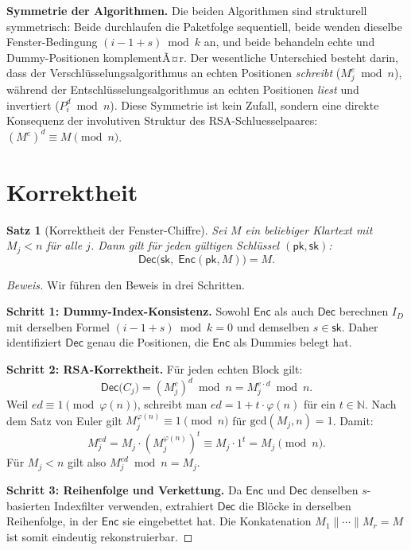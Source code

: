 ﻿\documentclass[12pt, a4paper]{article}
\theoremstyle{plain}
\newtheorem{theorem}{Satz}[section]
\theoremstyle{definition}
\theoremstyle{remark}
\newenvironment{myproof}[1][Beweis]{%
  \begin{proof}[#1]
}{%
  \end{proof}
}
\newcommand{\N}{\mathbb{N}}
\newcommand{\pk}{\mathsf{pk}}
\newcommand{\sk}{\mathsf{sk}}
\newcommand{\Enc}{\mathsf{Enc}}
\newcommand{\Dec}{\mathsf{Dec}}
\newcommand{\GCD}{\mathrm{gcd}}
\begin{document}
\medskip
\noindent\textbf{Symmetrie der Algorithmen.}
Die beiden Algorithmen sind strukturell symmetrisch: Beide durchlaufen
die Paketfolge sequentiell, beide wenden dieselbe Fenster-Bedingung
$(i - 1 + s) \bmod k$ an, und beide behandeln echte und Dummy-Positionen
komplementÃ¤r. Der wesentliche Unterschied besteht darin, dass der
Verschl\"usselungsalgorithmus an echten Positionen \emph{schreibt}
($M_j^e \bmod n$), w\"ahrend der Entschl\"usselungsalgorithmus an echten
Positionen \emph{liest} und invertiert ($P_i^d \bmod n$). Diese Symmetrie
ist kein Zufall, sondern eine direkte Konsequenz der involutiven Struktur
des RSA-Schluesselpaa\-res: $(M^e)^d \equiv M \pmod{n}$.

\section{Korrektheit}
\label{sec:korrektheit}

\begin{theorem}[Korrektheit der Fenster-Chiffre]\label{thm:korrektheit}
  Sei $M$ ein beliebiger Klartext mit $M_j < n$ f\"ur alle $j$.
  Dann gilt f\"ur jeden g\"ultigen Schl\"ussel $(\pk,\sk)$:
  \[
    \Dec\!\bigl(\sk,\;\Enc(\pk, M)\bigr) = M.
  \]
\end{theorem}

\begin{myproof}
  Wir f\"uhren den Beweis in drei Schritten.

  \medskip\noindent\textbf{Schritt 1: Dummy-Index-Konsistenz.}
  Sowohl $\Enc$ als auch $\Dec$ berechnen $I_D$ mit derselben Formel
  $(i-1+s) \bmod k = 0$ und demselben $s \in \sk$. Daher identifiziert
  $\Dec$ genau die Positionen, die $\Enc$ als Dummies belegt hat.

  \medskip\noindent\textbf{Schritt 2: RSA-Korrektheit.}
  F\"ur jeden echten Block gilt:
  \[
    \Dec\!\bigl(C_j\bigr) = (M_j^e)^d \bmod n = M_j^{e \cdot d} \bmod n.
  \]
  Weil $ed \equiv 1 \pmod{\varphi(n)}$, schreibt man $ed = 1 + t\cdot\varphi(n)$
  f\"ur ein $t \in \N$. Nach dem Satz von Euler gilt $M_j^{\varphi(n)} \equiv 1 \pmod{n}$
  f\"ur $\GCD(M_j, n) = 1$. Damit:
  \[
    M_j^{ed} = M_j \cdot (M_j^{\varphi(n)})^t \equiv M_j \cdot 1^t = M_j \pmod{n}.
  \]
  F\"ur $M_j < n$ gilt also $M_j^{ed} \bmod n = M_j$.

  \medskip\noindent\textbf{Schritt 3: Reihenfolge und Verkettung.}
  Da $\Enc$ und $\Dec$ denselben $s$-basierten Indexfilter verwenden,
  extrahiert $\Dec$ die Bl\"ocke in derselben Reihenfolge, in der $\Enc$
  sie eingebettet hat. Die Konkatenation $M_1 \| \cdots \| M_r = M$
  ist somit eindeutig rekonstruierbar. 
\end{myproof}
\end{document}
